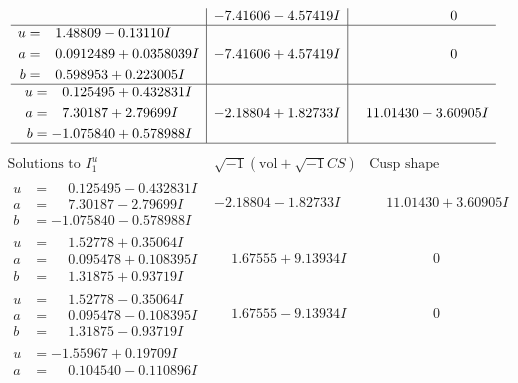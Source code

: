 \documentclass[1p]{elsarticle_modified}
\theoremstyle{definition}
\newcommand{\I}{\sqrt{-1}}
\begin{document}
$$\begin{array}{c|c|c}
 & -7.41606 - 4.57419 I & \phantom{-0.000000 } 0 \\ \hline\begin{aligned}
u &= \phantom{-}1.48809 - 0.13110 I \\
a &= \phantom{-}0.0912489 + 0.0358039 I \\
b &= \phantom{-}0.598953 + 0.223005 I\end{aligned}
 & -7.41606 + 4.57419 I & \phantom{-0.000000 } 0 \\ \hline\begin{aligned}
u &= \phantom{-}0.125495 + 0.432831 I \\
a &= \phantom{-}7.30187 + 2.79699 I \\
b &= -1.075840 + 0.578988 I\end{aligned}
 & -2.18804 + 1.82733 I & \phantom{-}11.01430 - 3.60905 I\\
 \hline 
 \end{array}$$\newpage$$\begin{array}{c|c|c}  
\text{Solutions to }I^u_{1}& \I (\text{vol} + \sqrt{-1}CS) & \text{Cusp shape}\\
 \hline 
\begin{aligned}
u &= \phantom{-}0.125495 - 0.432831 I \\
a &= \phantom{-}7.30187 - 2.79699 I \\
b &= -1.075840 - 0.578988 I\end{aligned}
 & -2.18804 - 1.82733 I & \phantom{-}11.01430 + 3.60905 I \\ \hline\begin{aligned}
u &= \phantom{-}1.52778 + 0.35064 I \\
a &= \phantom{-}0.095478 + 0.108395 I \\
b &= \phantom{-}1.31875 + 0.93719 I\end{aligned}
 & \phantom{-}1.67555 + 9.13934 I & \phantom{-0.000000 } 0 \\ \hline\begin{aligned}
u &= \phantom{-}1.52778 - 0.35064 I \\
a &= \phantom{-}0.095478 - 0.108395 I \\
b &= \phantom{-}1.31875 - 0.93719 I\end{aligned}
 & \phantom{-}1.67555 - 9.13934 I & \phantom{-0.000000 } 0 \\ \hline\begin{aligned}
u &= -1.55967 + 0.19709 I \\
a &= \phantom{-}0.104540 - 0.110896 I \\

\end{aligned}
\end{array}$$
\end{document}
